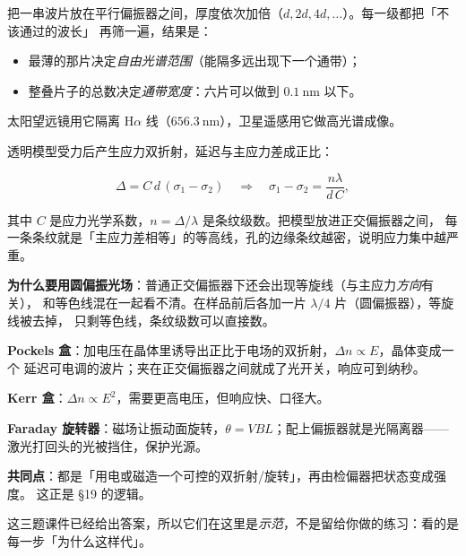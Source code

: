 \documentclass[11pt]{ctexart}
\let\subhdrtheme\subhdr
\renewcommand{\subhdr}[1]{\needspace{3\baselineskip}\subhdrtheme{#1}}
\let\hdrorig\hdr
\renewcommand{\hdr}[2]{\needspace{8\baselineskip}\hdrorig{#1}{#2}}
\begin{document}


把一串波片放在平行偏振器之间，厚度依次加倍（$d,2d,4d,\dots$）。每一级都把「不该通过的波长」
再筛一遍，结果是：

\begin{itemize}[leftmargin=1.8em]
\item 最薄的那片决定\emph{自由光谱范围}（能隔多远出现下一个通带）；
\item 整叠片子的总数决定\emph{通带宽度}：六片可以做到 $0.1\ \mathrm{nm}$ 以下。
\end{itemize}

太阳望远镜用它隔离 H$\alpha$ 线（$656.3\ \mathrm{nm}$），卫星遥感用它做高光谱成像。


透明模型受力后产生应力双折射，延迟与主应力差成正比：

\[
\Delta=C\,d\,(\sigma_1-\sigma_2)\quad\Longrightarrow\quad
\sigma_1-\sigma_2=\frac{n\lambda}{d\,C},
\]

其中 $C$ 是应力光学系数，$n=\Delta/\lambda$ 是条纹级数。把模型放进正交偏振器之间，
每一条条纹就是「主应力差相等」的等高线，孔的边缘条纹越密，说明应力集中越严重。

\textbf{为什么要用圆偏振光场}：普通正交偏振器下还会出现等旋线（与主应力\emph{方向}有关），
和等色线混在一起看不清。在样品前后各加一片 $\lambda/4$ 片（圆偏振器），等旋线被去掉，
只剩等色线，条纹级数可以直接数。


\textbf{Pockels 盒}：加电压在晶体里诱导出正比于电场的双折射，$\Delta n\propto E$，晶体变成一个
延迟可电调的波片；夹在正交偏振器之间就成了光开关，响应可到纳秒。

\textbf{Kerr 盒}：$\Delta n\propto E^2$，需要更高电压，但响应快、口径大。

\textbf{Faraday 旋转器}：磁场让振动面旋转，$\theta=VBL$；配上偏振器就是光隔离器——
激光打回头的光被挡住，保护光源。

\textbf{共同点}：都是「用电或磁造一个可控的双折射/旋转」，再由检偏器把状态变成强度。
这正是 §19 的逻辑。


这三题课件已经给出答案，所以它们在这里是\emph{示范}，不是留给你做的练习：看的是每一步「为什么这样代」。
\end{document}
